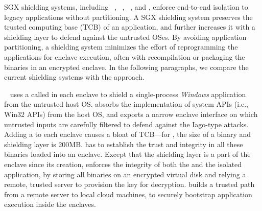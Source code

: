 SGX shielding systems, including \haven{}~\cite{baumann14haven}, \scone{}~\cite{osdi16scone}, \panoply{}~\cite{shinde17panoply}, and \graphenesgx{}, enforce end-to-end isolation to
legacy applications without partitioning.
A SGX shielding system preserves the trusted computing base (TCB)
of an application, and further increases it with a shielding layer to defend against the untrusted OSes.
By avoiding application partitioning,
a shielding system minimizes the effort of reprogramming the applications for enclave execution, often with recompilation or packaging the binaries in an encrypted enclave.
In the following paragraphs, we compare the current shielding systems with the \graphenesgx{} approach.

\haven{}~\cite{baumann14haven} uses a \libos{} called \drawbridge{} in each enclave
to shield a single-process \emph{Windows} application from the untrusted host OS.
\haven{} absorbs the implementation of system APIs (i.e., Win32 APIs) from the host OS,
and exports a narrow enclave interface on which untrusted inputs are carefully filtered to defend against the Iago-type attacks.
Adding a \libos{} to each enclave causes a bloat of TCB---for \haven{}, the size of a \libos{} binary and shielding layer is \roughly{}200MB.
\haven{} has to establish the trust and integrity in all these binaries loaded into an enclave. Except that the shielding layer is a part of the enclave since its creation, \haven{} enforces the integrity of both the \libos{} and the isolated application,
by storing all binaries on an encrypted virtual disk and relying a remote, trusted server to provision the key for decryption.
\haven{} builds a trusted path from a remote server to local cloud machines,
to securely bootstrap application execution inside the enclaves.



